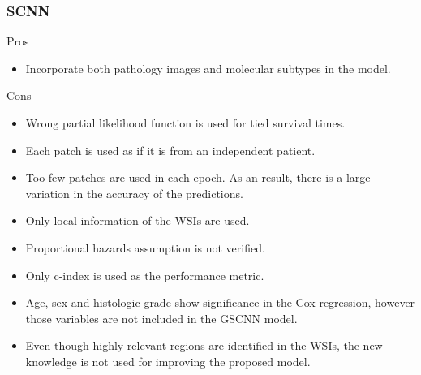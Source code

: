 \documentclass{beamer}
\begin{document}
	\begin{frame}
		\frametitle{SCNN}
		Pros 
		\begin{itemize}
			\item Incorporate both pathology images and molecular subtypes in the model.
		\end{itemize}
		Cons
		\begin{itemize}
			\item Wrong partial likelihood function is used for tied survival times.
			\item Each patch is used as if it is from an independent patient.
			\item Too few patches are used in each epoch. As an result, there is a large variation in the accuracy of the predictions.
			\item Only local information of the WSIs are used.
			\item Proportional hazards assumption is not verified.
			\item Only c-index is used as the performance metric.
			\item Age, sex and histologic grade show significance in the Cox regression, however those variables are not included in the GSCNN model.
			\item Even though highly relevant regions are identified in the WSIs, the new knowledge is not used for improving the proposed model.
		\end{itemize}
	\end{frame}

	\begin{frame}[allowframebreaks]
		\begin{singlespace}
			
			
		\end{singlespace}
	\end{frame}
	
\end{document}
